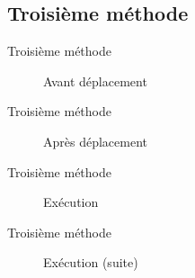\subsection*{Troisième méthode}
\begin{frame}{Troisième méthode}
	\begin{figure}[h!]
		\centering
		
		\caption{Avant déplacement}
		\label{fig:deplacementMethode3}
	\end{figure}
\end{frame}

\begin{frame}{Troisième méthode}
	\begin{figure}[h!]
		\centering
		
		\caption{Après déplacement}
		\label{fig:deplacementMethode3-2}
	\end{figure}
\end{frame}

\begin{frame}{Troisième méthode}
	\begin{figure}[h!]
		\centering
		
		\caption{Exécution}
		\label{fig:deplacementMethode3-3}
	\end{figure}
\end{frame}

\begin{frame}{Troisième méthode}
	\begin{figure}[h!]
		\centering
		
		\caption{Exécution (suite)}
		\label{fig:deplacementMethode3-4}
	\end{figure}
\end{frame}